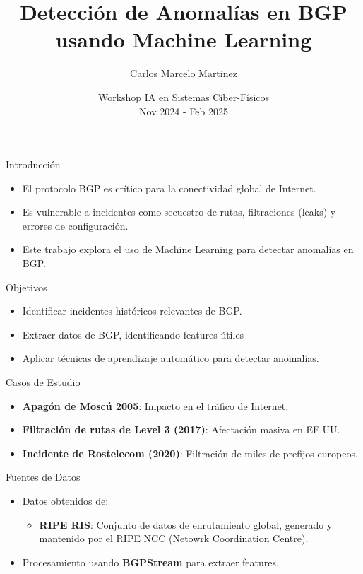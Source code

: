 \documentclass{beamer}
\title{Detección de Anomalías en BGP usando Machine Learning}
\author{Carlos Marcelo Martinez}
\date{Workshop IA en Sistemas Ciber-Físicos \\ Nov 2024 - Feb 2025}
\begin{document}
\begin{frame}
    \titlepage
\end{frame}

\begin{frame}{Introducción}
    \begin{itemize}
        \item El protocolo BGP es crítico para la conectividad global de Internet.
        \item Es vulnerable a incidentes como secuestro de rutas, filtraciones (leaks) y errores de configuración.
        \item Este trabajo explora el uso de Machine Learning para detectar anomalías en BGP.
    \end{itemize}
\end{frame}

\begin{frame}{Objetivos}
    \begin{itemize}
        \item Identificar incidentes históricos relevantes de BGP.
        \item Extraer datos de BGP, identificando features útiles
        \item Aplicar técnicas de aprendizaje automático para detectar anomalías.
    \end{itemize}
\end{frame}


\begin{frame}{Casos de Estudio}
    \begin{itemize}
        \item \textbf{Apagón de Moscú 2005}: Impacto en el tráfico de Internet.
        \item \textbf{Filtración de rutas de Level 3 (2017)}: Afectación masiva en EE.UU.
        \item \textbf{Incidente de Rostelecom (2020)}: Filtración de miles de prefijos europeos.
    \end{itemize}
\end{frame}


\begin{frame}{Fuentes de Datos}
    \begin{itemize}
        \item Datos obtenidos de:
        \begin{itemize}
            \item \textbf{RIPE RIS}: Conjunto de datos de enrutamiento global, generado y mantenido por el RIPE NCC (Netowrk Coordination Centre).
        \end{itemize}
        \item Procesamiento usando \textbf{BGPStream} para extraer features.
    \end{itemize}
\end{frame}
\end{document}
